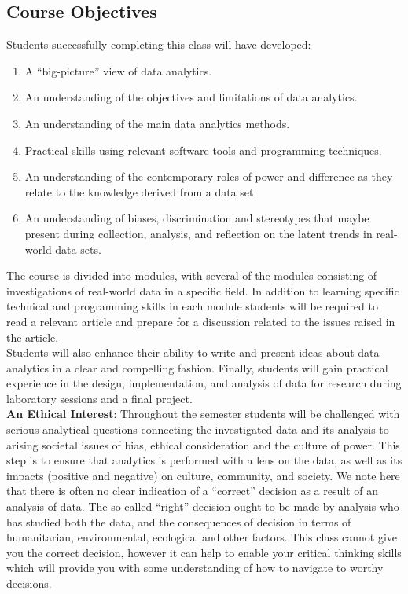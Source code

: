 \documentclass[11pt]{article} %
\begin{document}
\subsection*{\textbf{Course Objectives}}
Students successfully completing this class will have developed:
\begin{enumerate}

  \item A “big-picture” view of data analytics.
  \item An understanding of the objectives and limitations of data analytics.
  \item An understanding of the main data analytics methods.
  \item Practical skills using relevant software tools and programming techniques. 
  \item An understanding of the contemporary roles of power and difference as they relate to the knowledge derived from a data set.
  \item An understanding of biases, discrimination and stereotypes that maybe present during collection, analysis, and reflection on the latent trends in real-world data sets.

\end{enumerate}

\noindent The course is divided into modules, with several of the modules consisting of investigations of real-world data in a specific field. In addition to learning specific technical and programming skills in each module students will be required to read a relevant article and prepare for a discussion related to the issues raised in the article.\\

\noindent Students will also enhance their ability to write and present ideas about data analytics in a clear and compelling fashion. Finally, students will gain practical experience in the design, implementation, and analysis of data for research during laboratory sessions and a final project.\\

\noindent \textbf{An Ethical Interest}: Throughout the semester students will be challenged with serious analytical questions connecting the investigated data and its analysis to arising societal issues of bias, ethical consideration and the culture of power. This step is to ensure that analytics is performed with a lens on the data, as well as its impacts (positive and negative) on culture, community, and society. We note here that there is often no clear indication of a ``correct'' decision as a result of an analysis of data. The so-called ``right'' decision ought to be made by analysis who has studied both the data, and the consequences of decision in terms of humanitarian, environmental, ecological and other factors. This class cannot give you the correct decision, however it can help to enable your critical thinking skills which will provide you with some understanding of how to navigate to worthy decisions.\\
\end{document}
